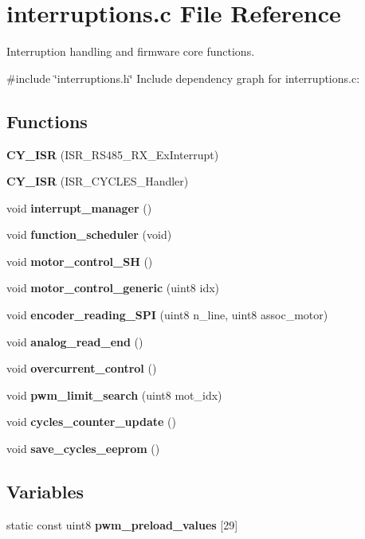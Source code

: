 \section{interruptions.\+c File Reference}
\label{interruptions_8c}


Interruption handling and firmware core functions.  


{\ttfamily \#include \char`\"{}interruptions.\+h\char`\"{}}\newline
Include dependency graph for interruptions.\+c\+:
\subsection*{Functions}
\begin{DoxyCompactItemize}
\item 
\mbox{\label{interruptions_8c_a7692d8c3185943c5bdfaa6de0a172ad3}} 
{\bfseries C\+Y\+\_\+\+I\+SR} (I\+S\+R\+\_\+\+R\+S485\+\_\+\+R\+X\+\_\+\+Ex\+Interrupt)
\item 
\mbox{\label{interruptions_8c_a2347671848e5c23aa5df4ce2f2fd869d}} 
{\bfseries C\+Y\+\_\+\+I\+SR} (I\+S\+R\+\_\+\+C\+Y\+C\+L\+E\+S\+\_\+\+Handler)
\item 
void \textbf{ interrupt\+\_\+manager} ()
\item 
void \textbf{ function\+\_\+scheduler} (void)
\item 
void \textbf{ motor\+\_\+control\+\_\+\+SH} ()
\item 
void \textbf{ motor\+\_\+control\+\_\+generic} (uint8 idx)
\item 
void \textbf{ encoder\+\_\+reading\+\_\+\+S\+PI} (uint8 n\+\_\+line, uint8 assoc\+\_\+motor)
\item 
void \textbf{ analog\+\_\+read\+\_\+end} ()
\item 
void \textbf{ overcurrent\+\_\+control} ()
\item 
void \textbf{ pwm\+\_\+limit\+\_\+search} (uint8 mot\+\_\+idx)
\item 
void \textbf{ cycles\+\_\+counter\+\_\+update} ()
\item 
void \textbf{ save\+\_\+cycles\+\_\+eeprom} ()
\end{DoxyCompactItemize}
\subsection*{Variables}
\begin{DoxyCompactItemize}
\item 
static const uint8 {\bfseries pwm\+\_\+preload\+\_\+values} [29]
\end{DoxyCompactItemize}


